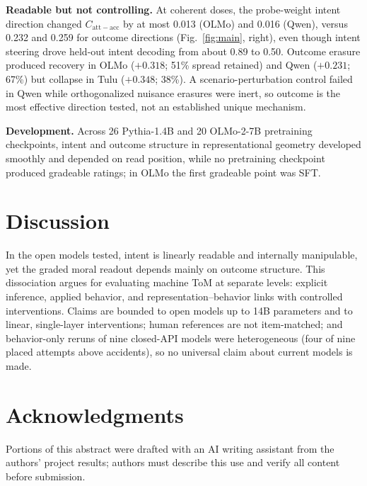 \documentclass{ccn}
\newcommand{\contrast}{C_{\mathrm{att-acc}}}
\begin{document}
\textbf{Readable but not controlling.}
At coherent doses, the probe-weight intent direction changed $\contrast$ by at most 0.013 (OLMo) and 0.016 (Qwen), versus 0.232 and 0.259 for outcome directions (Fig.~\ref{fig:main}, right), even though intent steering drove held-out intent decoding from about 0.89 to 0.50.
Outcome erasure produced recovery in OLMo ($+0.318$; 51\% spread retained) and Qwen ($+0.231$; 67\%) but collapse in Tulu ($+0.348$; 38\%).
A scenario-perturbation control failed in Qwen while orthogonalized nuisance erasures were inert, so outcome is the most effective direction tested, not an established unique mechanism.

\textbf{Development.}
Across 26 Pythia-1.4B and 20 OLMo-2-7B pretraining checkpoints, intent and outcome structure in representational geometry developed smoothly and depended on read position, while no pretraining checkpoint produced gradeable ratings; in OLMo the first gradeable point was SFT.

\section{Discussion}

In the open models tested, intent is linearly readable and internally manipulable, yet the graded moral readout depends mainly on outcome structure.
This dissociation argues for evaluating machine ToM at separate levels: explicit inference, applied behavior, and representation--behavior links with controlled interventions.
Claims are bounded to open models up to 14B parameters and to linear, single-layer interventions; human references are not item-matched; and behavior-only reruns of nine closed-API models were heterogeneous (four of nine placed attempts above accidents), so no universal claim about current models is made.

\section*{Acknowledgments}
Portions of this abstract were drafted with an AI writing assistant from the authors' project results; authors must describe this use and verify all content before submission.

\printbibliography
\end{document}
